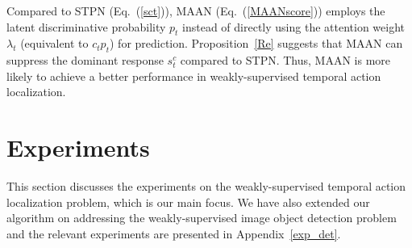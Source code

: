 \documentclass{article} \usepackage{iclr2019_conference,times}
\begin{document}
Compared to STPN (Eq.~(\ref{sct})), MAAN (Eq.~(\ref{MAANscore})) employs the latent discriminative probability $p_t$ instead of directly using the attention weight $\lambda_t$ (equivalent to $ c_t p_t$) for prediction. Proposition~\ref{Re} suggests that MAAN can suppress the dominant response $s^c_t$ compared to STPN. Thus, MAAN is more likely to achieve a better performance in weakly-supervised temporal action localization.  









  




















 















\section{Experiments}
This section discusses the experiments on the weakly-supervised temporal action localization problem, which is our main focus. We have also extended our algorithm on addressing the weakly-supervised image object detection problem and the relevant experiments are presented in Appendix~\ref{exp_det}.
\end{document}
